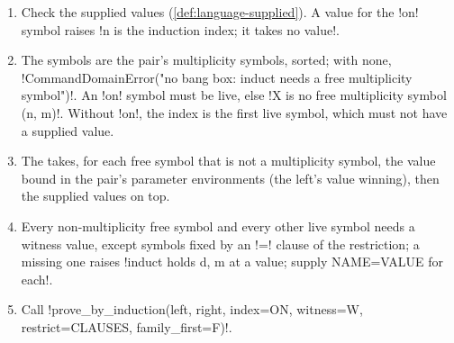 \begin{algorithm}\label{alg:language-induct}
\leavevmode
\begin{enumerate}
\item Check the supplied values (\cref{def:language-supplied}). A value for the \code!on! symbol raises \code!n is the induction index; it takes no value!.
\item The  symbols are the pair's multiplicity symbols, sorted; with none, \code!CommandDomainError("no bang box: induct needs a free multiplicity symbol")!. An \code!on! symbol must be live, else \code!X is no free multiplicity symbol (n, m)!. Without \code!on!, the index is the first live symbol, which must not have a supplied value.
\item The  takes, for each free symbol that is not a multiplicity symbol, the value bound in the pair's parameter environments (the left's value winning), then the supplied values on top.
\item Every non-multiplicity free symbol and every other live symbol needs a witness value, except symbols fixed by an \code!=! clause of the restriction; a missing one raises \code!induct holds d, m at a value; supply NAME=VALUE for each!.
\item Call \py!prove_by_induction(left, right, index=ON, witness=W, restrict=CLAUSES, family_first=F)!.
\end{enumerate}
\end{algorithm}

